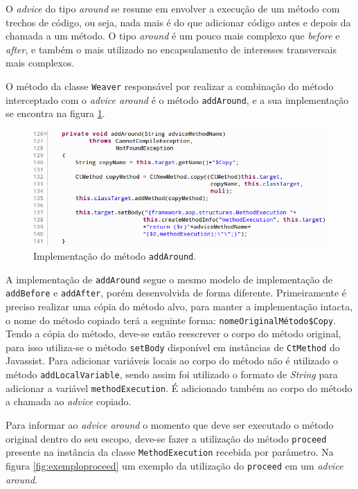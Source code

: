 \documentclass[tc,oneside]{iiufrgs}
\begin{document}
O \textit{advice} do tipo \textit{around} se resume em envolver a execução de um método com trechos de código, ou seja, nada mais é do que adicionar código antes e depois da chamada a um método. O tipo \textit{around}
é um pouco mais complexo que \textit{before} e \textit{after}, e também o mais utilizado no encapsulamento de interesses transversais mais complexos.  

O método da classe \texttt{Weaver} responsável por realizar a combinação do método interceptado com o \textit{advice around} é o método \texttt{addAround}, e a sua implementação se encontra na figura \ref{fig:addaround}.

\begin{figure}[ht]
	\centering
	\includegraphics[scale=0.5]{figuras/implementacao/addaround.png}
	\caption{Implementação do método \texttt{addAround}.}
	\label{fig:addaround}
\end{figure}

A implementação de \texttt{addAround} segue o mesmo modelo de implementação de \texttt{addBefore} e \texttt{addAfter}, porém desenvolvida de forma diferente. Primeiramente é preciso realizar uma cópia do método alvo, para manter a implementação intacta, o nome do método copiado terá a seguinte forma: \texttt{nomeOriginalMétodo\$Copy}. Tendo a cópia do método, deve-se então reescrever o corpo do método original, para isso utiliza-se o método \texttt{setBody} disponível em instâncias de \texttt{CtMethod} do Javassist. Para adicionar variáveis locais ao corpo do método não é utilizado o método \texttt{addLocalVariable}, sendo assim foi utilizado o formato de \textit{String} para adicionar a variável \texttt{methodExecution}. É adicionado também ao corpo do método a chamada ao \textit{advice} copiado.

Para informar ao \textit{advice around} o momento que deve ser executado o método original dentro do seu escopo, deve-se fazer a utilização do método \texttt{proceed} presente na instância da classe \texttt{MethodExecution} recebida por parâmetro. Na figura \ref{fig:exemploproceed} um exemplo da utilização do \texttt{proceed} em um \textit{advice around}.
\end{document}
